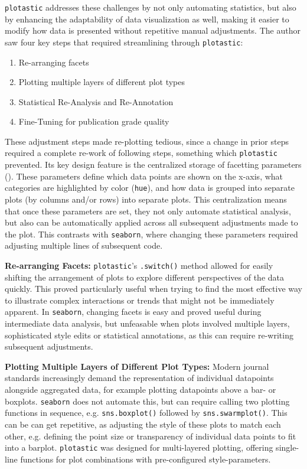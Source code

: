 \texttt{plotastic} addresses these challenges by not only automating statistics,
but also by enhancing the adaptability of data visualization as well, making it
easier to modify how data is presented without repetitive manual adjustments.
The author saw four key steps that required streamlining through \texttt{plotastic}:
\begin{enumerate}
    \item {Re-arranging facets}
    \item {Plotting multiple layers of different plot types}
    \item {Statistical Re-Analysis and Re-Annotation}
    \item {Fine-Tuning for publication grade quality}
\end{enumerate}

These adjustment steps made re-plotting tedious, since a change in prior steps
required a complete re-work of following steps, something which
\texttt{plotastic} prevented. Its key design feature is the centralized
storage of facetting parameters (\facetparams). These parameters define which
data points are shown on the x-axis, what categories are highlighted by color
(\texttt{hue}), and how data is grouped into separate plots (by columns and/or
rows) into separate plots. This centralization means that once these parameters
are set, they not only automate statistical analysis, but also can be
automatically applied across all subsequent adjustments made to the plot. This
contrasts with \texttt{seaborn}, where changing these parameters
required adjusting multiple lines of subsequent code.

\textbf{Re-arranging Facets:} \texttt{plotastic}'s \texttt{.switch()} method
allowed for easily shifting the arrangement of plots  to explore different perspectives of the data quickly. This proved
particularly useful when trying to find the most effective way to illustrate
complex interactions or trends that might not be immediately apparent. In
\texttt{seaborn}, changing facets is easy and proved useful during
intermediate data analysis, but unfeasable when plots involved multiple
layers, sophisticated style edits or statistical annotations, as this can
require re-writing subsequent adjustments.


\textbf{Plotting Multiple Layers of Different Plot Types:}
Modern journal standards increasingly demand the representation of individual
datapoints alongside aggregated data, for example plotting datapoints above a
bar- or boxplots. \texttt{seaborn} does not automate this, but can require
calling two plotting functions in sequence, e.g. \texttt{sns.boxplot()} followed
by \texttt{sns.swarmplot()}. This can be can get repetitive, as adjusting the
style of these plots to match each other, e.g. defining the point
size or transparency of individual data points to fit into a barplot.
\texttt{plotastic} was designed for multi-layered plotting, offering single-line
functions for plot combinations with pre-configured style-parameters.

